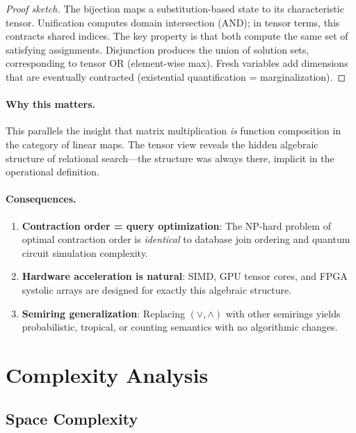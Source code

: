 \documentclass[11pt,a4paper]{article}
\begin{document}
\begin{proof}[Proof sketch]
The bijection maps a substitution-based state to its characteristic tensor.
Unification computes domain intersection (AND); in tensor terms, this contracts
shared indices. The key property is that both compute the same set of satisfying assignments.
Disjunction produces the union of solution sets, corresponding to tensor OR (element-wise max).
Fresh variables add dimensions that are eventually contracted (existential quantification = marginalization).
\end{proof}

\paragraph{Why this matters.}
This parallels the insight that matrix multiplication \emph{is} function composition
in the category of linear maps. The tensor view reveals the hidden algebraic
structure of relational search---the structure was always there, implicit in the
operational definition.

\paragraph{Consequences.}
\begin{enumerate}
  \item \textbf{Contraction order = query optimization}: The NP-hard problem of
    optimal contraction order is \emph{identical} to database join ordering and
    quantum circuit simulation complexity.
  \item \textbf{Hardware acceleration is natural}: SIMD, GPU tensor cores, and
    FPGA systolic arrays are designed for exactly this algebraic structure.
  \item \textbf{Semiring generalization}: Replacing $(\lor, \land)$ with other
    semirings yields probabilistic, tropical, or counting semantics with no
    algorithmic changes.
\end{enumerate}

\section{Complexity Analysis}
\label{sec:complexity_chirho}

\subsection{Space Complexity}
\end{document}
